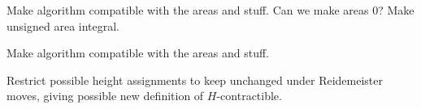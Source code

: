 \documentclass[General-Information/Most_recent_log(3_0).tex]{subfiles}
\begin{document}
\begin{question}
    Make algorithm compatible with the areas and stuff. Can we make areas 0? Make unsigned area integral.
\end{question}

\begin{question}
    Make algorithm compatible with the areas and stuff.
\end{question}

\begin{question}
    Restrict possible height assignments to keep unchanged under Reidemeister moves, giving possible new definition of $H$-contractible.
\end{question}

\begin{question}
    
\end{question}
\end{document}
